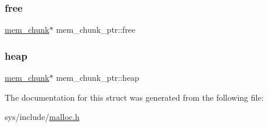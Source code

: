 \subsubsection{\texorpdfstring{free}{free}}
{\footnotesize\ttfamily \hyperlink{structmem__chunk}{mem\+\_\+chunk}$\ast$ mem\+\_\+chunk\+\_\+ptr\+::free}

\mbox{\label{structmem__chunk__ptr_aaddfb089e921369846e272d2d2b56e84}} 
\subsubsection{\texorpdfstring{heap}{heap}}
{\footnotesize\ttfamily \hyperlink{structmem__chunk}{mem\+\_\+chunk}$\ast$ mem\+\_\+chunk\+\_\+ptr\+::heap}



The documentation for this struct was generated from the following file\+:\begin{DoxyCompactItemize}
\item 
sys/include/\hyperlink{malloc_8h}{malloc.\+h}\end{DoxyCompactItemize}
